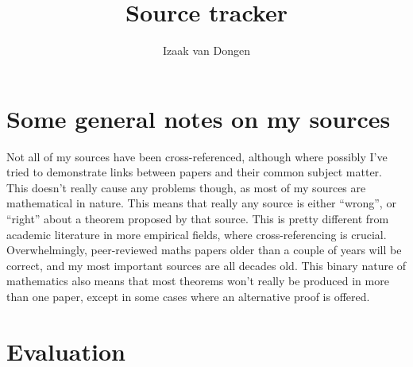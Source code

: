 \documentclass{article}
\title{Source tracker}
\author{Izaak van Dongen}
\begin{document}
    \maketitle

    \section{Some general notes on my sources} \label{sourcenotes}

    Not all of my sources have been cross-referenced, although where possibly
    I've tried to demonstrate links between papers and their common subject
    matter. This doesn't really cause any problems though, as most of my
    sources are mathematical in nature. This means that really any source is
    either ``wrong'', or ``right'' about a theorem proposed by that source.
    This is pretty different from academic literature in more empirical fields,
    where cross-referencing is crucial.  Overwhelmingly, peer-reviewed maths
    papers older than a couple of years will be correct, and my most important
    sources are all decades old. This binary nature of mathematics also means
    that most theorems won't really be produced in more than one paper, except
    in some cases where an alternative proof is offered.

    \section{Evaluation}
\end{document}
